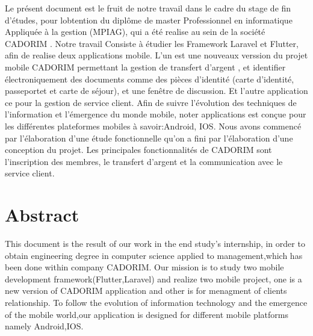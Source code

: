 \documentclass[a4paper, 12pt]{report}
\begin{document}
			
	Le présent document est le fruit de notre travail dans le cadre du stage de fin d'études, pour lobtention du diplôme de master Professionnel en informatique 	Appliquée à la gestion (MPIAG), qui a été realise au sein de la société CADORIM . Notre travail Consiste à étudier les Framework Laravel et Flutter, afin de realise deux applications mobile. L'un est une nouveaux verssion du projet mobile CADORIM permettant la gestion de transfert d'argent  , et  identifier électroniquement des documents comme des pièces d’identité (carte d’identité, passeportet et carte de séjour), et une fenêtre de discussion.
	Et l'autre application ce pour la gestion de service client.\newline\newline
	Afin de suivre l'évolution des techniques de l'information et l'émergence du monde mobile, noter  applications est conçue pour les différentes plateformes mobiles à savoir:Android, IOS.\newline\newline
	Nous avons commencé par l'élaboration d'une étude fonctionnelle qu'on a fini par l'élaboration d'une conception du projet.\newline\newline
	Les principales fonctionnalités de CADORIM sont l'inscription des membres, le transfert d'argent et la communication avec le service client.

	
	\thispagestyle{empty}
	\chapter*{Abstract} \label{chap:1Resumé1}
This document is the result of our work in the end study's  internship,
in order to obtain engineering degree in computer science applied to management,which has been done within company CADORIM. Our mission is to study two mobile development framework(Flutter,Laravel) and realize two mobile project, one is a new version of  CADORIM application and other is for menagment of clients relationship.\newline\newline
To follow the evolution of information technology and the emergence of the mobile world,our application is designed for different mobile platforms  namely Android,IOS.\newline\newline
\end{document}
